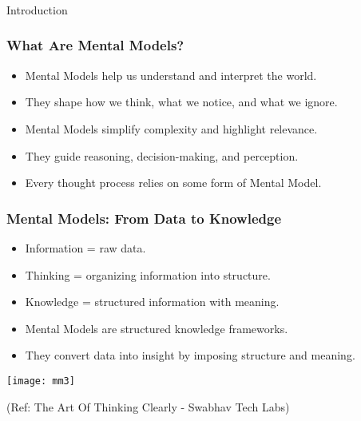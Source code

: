 \begin{frame}[fragile]\frametitle{}
\begin{center}
{\Large Introduction}
\end{center}
\end{frame}

\begin{frame}[fragile]\frametitle{What Are Mental Models?}
      \begin{itemize}
        \item Mental Models help us understand and interpret the world.
        \item They shape how we think, what we notice, and what we ignore.
        \item Mental Models simplify complexity and highlight relevance.
        \item They guide reasoning, decision-making, and perception.
        \item Every thought process relies on some form of Mental Model.
      \end{itemize}
\end{frame}

\begin{frame}[fragile]\frametitle{Mental Models: From Data to Knowledge}
      \begin{itemize}
        \item Information = raw data.
        \item Thinking = organizing information into structure.
        \item Knowledge = structured information with meaning.
        \item Mental Models are structured knowledge frameworks.
        \item They convert data into insight by imposing structure and meaning.
      \end{itemize}
	  
	\begin{center}
	\texttt{[image: mm3]}
	\end{center}
	
{\tiny (Ref: The Art Of Thinking Clearly - Swabhav Tech Labs)}  	  
\end{frame}

